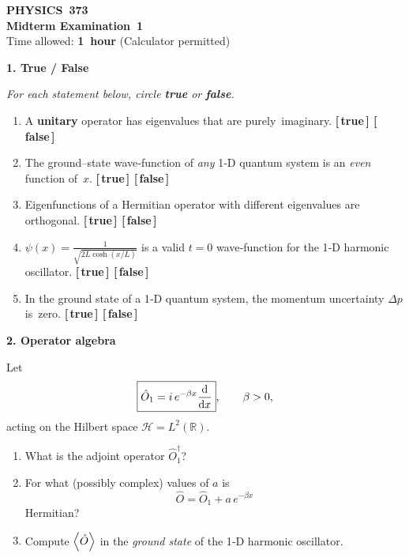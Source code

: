 \documentclass[12pt]{article}
\newcommand{\qs}{\bigskip\bigskip}   %
\newcommand{\vv}{\medskip}           %
\begin{document}
\begin{center}
    {\Large\bfseries PHYSICS 373 \\
    Midterm Examination 1}\\[2ex]
    Time allowed: \textbf{1 hour} \qquad (Calculator permitted)
\end{center}

\newpage
{\large\bfseries 1.\; True / False}\qs

\emph{For each statement below, circle \textbf{true} or \textbf{false}.}\vv

\begin{enumerate}[label=\textbf{\alph*)}, leftmargin=1.2cm]
  \item A \textbf{unitary} operator has eigenvalues that are purely~imaginary.
        \hfill \textbf{[\,true\,]  [\,false\,]}
  \vv
  \item The ground–state wave‑function of \emph{any} 1‑D quantum system is an
        \emph{even} function of~$x$.
        \hfill \textbf{[\,true\,]  [\,false\,]}
  \vv
  \item Eigenfunctions of a Hermitian operator with different eigenvalues are orthogonal.
        \hfill \textbf{[\,true\,]  [\,false\,]}
  \vv
  \item $\displaystyle
        \psi(x)=\frac{1}{\sqrt{2L\cosh(x/L)}}$ is a valid $t=0$ wave‑function for the 1‑D harmonic oscillator.
        \hfill \textbf{[\,true\,]  [\,false\,]}
  \vv
  \item In the ground state of a 1‑D quantum system, the momentum uncertainty
        $\Delta p$ is~zero.
        \hfill \textbf{[\,true\,]  [\,false\,]}
\end{enumerate}

\newpage
{\large\bfseries 2.\; Operator algebra}\qs

Let
\[
    \boxed{\hat O_1 = i\,e^{-\beta x}\dv{}{x}}, \qquad \beta>0,
\]
acting on the Hilbert space $\mathcal H = L^2(\mathbb R)$.

\vv
\begin{enumerate}[label=\textbf{\alph*)}, leftmargin=1.2cm]
  \item What is the adjoint operator $\hat O_1^{\dagger}$?\vv

  \item For what (possibly complex) values of $a$ is
        \[
            \hat O = \hat O_1 + a\,e^{-\beta x}
        \]
        Hermitian?\vv

  \item Compute $\displaystyle\expval{\hat O}$ in the \emph{ground state}
        of the 1‑D harmonic oscillator.
\end{enumerate}
\end{document}

